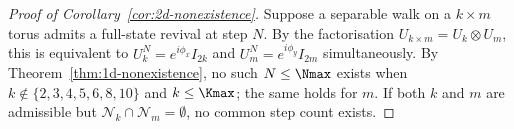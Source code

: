 \begin{proof}[Proof of Corollary~\ref{cor:2d-nonexistence}]
Suppose a separable walk on a $k \times m$ torus admits a
full-state revival at step $N$. By the factorisation
$U_{k \times m} = U_k \otimes U_m$, this is equivalent
to $U_k^N = e^{i\phi_x} I_{2k}$ and $U_m^N = e^{i\phi_y}
I_{2m}$ simultaneously. By Theorem~\ref{thm:1d-nonexistence},
no such $N \le \Nmax$  exists when $k \notin \{2, 3, 4, 5, 6, 8, 10\}$
and $k \le \Kmax$; the same holds for $m$. If both $k$
and $m$ are admissible but $\mathcal{N}_k \cap
\mathcal{N}_m = \emptyset$, no common step count exists.
\end{proof}
